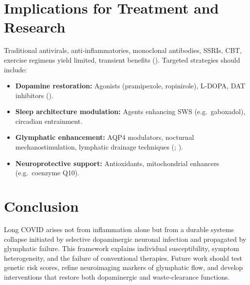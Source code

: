 \documentclass[12pt]{article}
\begin{document}
\section{Implications for Treatment and Research}
Traditional antivirals, anti‐inflammatories, monoclonal antibodies, SSRIs, CBT, exercise regimens yield limited, transient benefits (\citealp{SFChronicle2024}).  Targeted strategies should include:
\begin{itemize}
  \item \textbf{Dopamine restoration:} Agonists (pramipexole, ropinirole), L-DOPA, DAT inhibitors (\citealp{Beauchamp2022}).
  \item \textbf{Sleep architecture modulation:} Agents enhancing SWS (e.g.\ gaboxadol), circadian entrainment.
  \item \textbf{Glymphatic enhancement:} AQP4 modulators, nocturnal mechanostimulation, lymphatic drainage techniques (\citealp{Iliff2012}; \citealp{Ringstad2017}).
  \item \textbf{Neuroprotective support:} Antioxidants, mitochondrial enhancers (e.g.\ coenzyme Q10).
\end{itemize}

\section{Conclusion}
Long COVID arises not from inflammation alone but from a durable systems collapse initiated by selective dopaminergic neuronal infection and propagated by glymphatic failure.  This framework explains individual susceptibility, symptom heterogeneity, and the failure of conventional therapies.  Future work should test genetic risk scores, refine neuroimaging markers of glymphatic flow, and develop interventions that restore both dopaminergic and waste‐clearance functions.

\newpage


\end{document}
